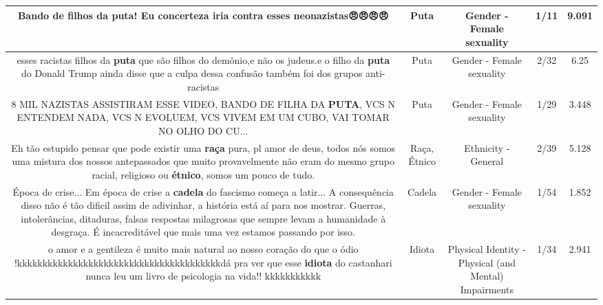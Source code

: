 \documentclass[11pt]{article}
\newlength\mylength
\begin{document}
\begin{center}
\begin{longtable}{|C{.65\mylength}|C{.30\mylength}|C{.12\mylength}|C{.12\mylength}|C{.12\mylength}|}
  \small Bando de filhos da \textbf{puta}! Eu concerteza iria contra esses neonazistas😠😠😠😠\normalsize   & Puta & Gender - Female sexuality & 1/11 & 9.091 \\  \hline
  \small esses racistas filhos da \textbf{puta} que são filhos do demônio,e não os judeus.e o filho da \textbf{puta} do Donald Trump ainda disse que a culpa dessa confusão também foi dos grupos anti-racistas\normalsize   & Puta & Gender - Female sexuality & 2/32 & 6.25 \\  \hline
  \small 8 MIL NAZISTAS ASSISTIRAM ESSE VIDEO, BANDO DE FILHA DA \textbf{PUTA}, VCS N ENTENDEM NADA, VCS N EVOLUEM, VCS VIVEM EM UM CUBO, VAI TOMAR NO OLHO DO CU...\normalsize   & Puta & Gender - Female sexuality & 1/29 & 3.448 \\  \hline
  \small Eh tão estupido pensar que pode existir uma \textbf{raça} pura, pl amor de deus, todos nós somos uma mistura dos nossos antepassados que muito provavelmente não eram do mesmo grupo racial, religioso ou \textbf{étnico}, somos um pouco de tudo.\normalsize   & Raça, Étnico & Ethnicity - General & 2/39 & 5.128 \\  \hline
  \small Época de crise... Em época de crise a \textbf{cadela} do fascismo começa a latir... A consequência disso não é tão dificil assim de adivinhar, a história está aí para nos mostrar. Guerras, intolerâncias, ditaduras, falsas respostas milagrosas que sempre levam a humanidade à desgraça. É incacreditável que mais uma vez estamos passando por isso.\normalsize   & Cadela & Gender - Female sexuality & 1/54 & 1.852 \\  \hline
  \small o amor e a gentileza é muito mais natural ao nosso coração do que o ódio !kkkkkkkkkkkkkkkkkkkkkkkkkkkkkkkkkkkkkkkkdá pra ver que esse \textbf{idiota} do castanhari nunca leu um livro de psicologia na vida!! kkkkkkkkkkk\normalsize   & Idiota & Physical Identity - Physical (and Mental) Impairments & 1/34 & 2.941 \\  \hline

\end{longtable}
\end{center}
\end{document}
